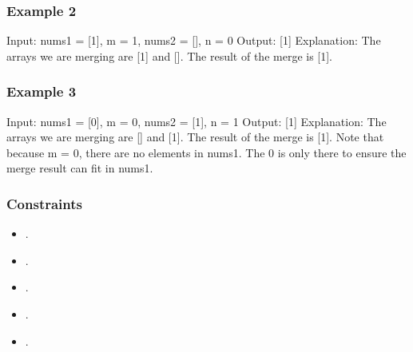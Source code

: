 \documentclass[letterpaper,12pt,english]{book}
\begin{document}
\subsubsection{Example 2}
\label{\detokenize{Sorting/04_SORT_88_Merge_Sorted_Array:example-2}}
\begin{sphinxVerbatim}[commandchars=\\\{\}]
Input: nums1 = [1], m = 1, nums2 = [], n = 0
Output: [1]
Explanation: The arrays we are merging are [1] and [].
The result of the merge is [1].
\end{sphinxVerbatim}


\subsubsection{Example 3}
\label{\detokenize{Sorting/04_SORT_88_Merge_Sorted_Array:example-3}}
\begin{sphinxVerbatim}[commandchars=\\\{\}]
Input: nums1 = [0], m = 0, nums2 = [1], n = 1
Output: [1]
Explanation: The arrays we are merging are [] and [1].
The result of the merge is [1].
Note that because m = 0, there are no elements in nums1. The 0 is only there to ensure the merge result can fit in nums1.
\end{sphinxVerbatim}


\subsubsection{Constraints}
\label{\detokenize{Sorting/04_SORT_88_Merge_Sorted_Array:constraints}}\begin{itemize}
\item {} 
\sphinxAtStartPar
{}.

\item {} 
\sphinxAtStartPar
{}.

\item {} 
\sphinxAtStartPar
{}.

\item {} 
\sphinxAtStartPar
{}.

\item {} 
\sphinxAtStartPar
{}.

\end{itemize}
\end{document}
